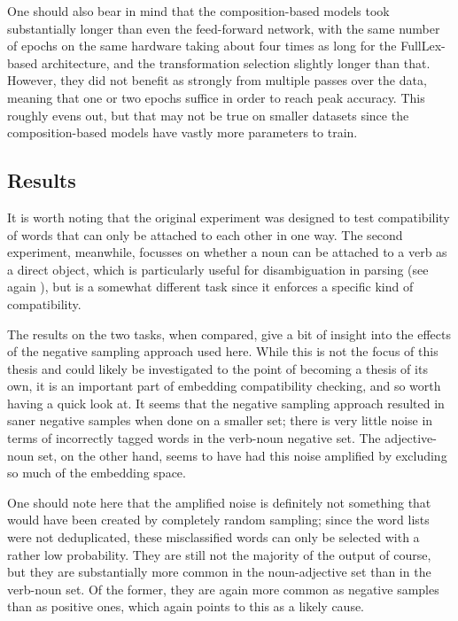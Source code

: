 \documentclass[a4paper, 12pt]{article}
\begin{document}
One should also bear in mind that the composition-based models took substantially longer than even the feed-forward network, with the same number of epochs on the same hardware taking about four times as long for the FullLex-based architecture, and the transformation selection slightly longer than that. However, they did not benefit as strongly from multiple passes over the data, meaning that one or two epochs suffice in order to reach peak accuracy. This roughly evens out, but that may not be true on smaller datasets since the composition-based models have vastly more parameters to train.

\subsection{Results}

It is worth noting that the original experiment was designed to test compatibility of words that can only be attached to each other in one way. The second experiment, meanwhile, focusses on whether a noun can be attached to a verb as a direct object, which is particularly useful for disambiguation in parsing (see again \cite{vanNoord}), but is a somewhat different task since it enforces a specific kind of compatibility.

The results on the two tasks, when compared, give a bit of insight into the effects of the negative sampling approach used here. While this is not the focus of this thesis and could likely be investigated to the point of becoming a thesis of its own, it is an important part of embedding compatibility checking, and so worth having a quick look at. It seems that the negative sampling approach resulted in saner negative samples when done on a smaller set; there is very little noise in terms of incorrectly tagged words in the verb-noun negative set. The adjective-noun set, on the other hand, seems to have had this noise amplified by excluding so much of the embedding space.

One should note here that the amplified noise is definitely not something that would have been created by completely random sampling; since the word lists were not deduplicated, these misclassified words can only be selected with a rather low probability. They are still not the majority of the output of course, but they are substantially more common in the noun-adjective set than in the verb-noun set. Of the former, they are again more common as negative samples than as positive ones, which again points to this as a likely cause.
\end{document}
